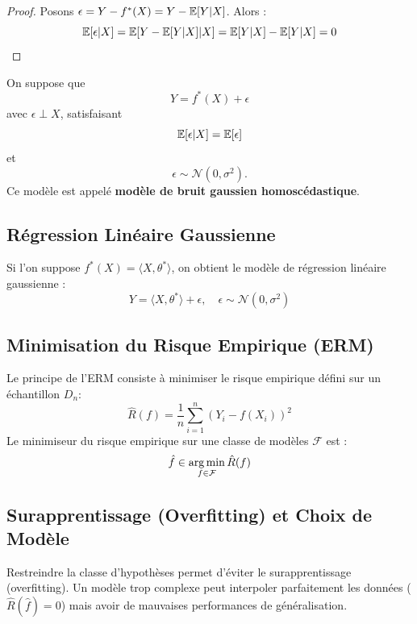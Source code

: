 \begin{proof}
Posons $\epsilon = Y - f^*(X) = Y - \mathbb{E}[Y|X]$. Alors :
\[
\mathbb{E}[\epsilon | X] = \mathbb{E}[Y - \mathbb{E}[Y|X] | X] = \mathbb{E}[Y|X] - \mathbb{E}[Y|X] = 0
\]
\end{proof}

\begin{exemple}
On suppose que 
\[
Y = f^*(X) + \epsilon
\]
avec $\epsilon \perp X$, satisfaisant
\[
\mathbb{E}[\epsilon | X] = \mathbb{E}[\epsilon]
\]
et
\[
\epsilon \sim \mathcal{N}(0, \sigma^2).
\]
Ce modèle est appelé \textbf{modèle de bruit gaussien homoscédastique}.
\end{exemple}

\subsection{Régression Linéaire Gaussienne}

Si l'on suppose $f^{*}(X) = \langle X, \theta^* \rangle$, on obtient le modèle de régression linéaire gaussienne :
\[
Y = \langle X, \theta^* \rangle + \epsilon, \quad \epsilon \sim \mathcal{N}(0, \sigma^2)
\]

\subsection{Minimisation du Risque Empirique (ERM)}

\begin{definition}
Le principe de l'ERM consiste à minimiser le risque empirique défini sur un échantillon $D_n$:
\begin{equation}
\hat{R}(f)=\frac{1}{n}\sum_{i=1}^{n}(Y_{i}-f(X_{i}))^{2}
\end{equation}
Le minimiseur du risque empirique sur une classe de modèles $\mathcal{F}$ est :
\begin{equation}
\hat{f} \in \operatorname*{arg\,min}_{f\in\mathcal{F}}\hat{R}(f)
\end{equation}
\end{definition}

\subsection{Surapprentissage (Overfitting) et Choix de Modèle}

Restreindre la classe d'hypothèses permet d'éviter le surapprentissage (overfitting). Un modèle trop complexe peut interpoler parfaitement les données ($\hat{R}(\hat{f})=0$) mais avoir de mauvaises performances de généralisation.

